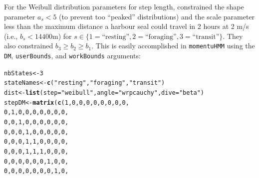 \documentclass[12pt]{article}\usepackage[]{graphicx}\usepackage[]{xcolor}
\makeatletter
\newcommand{\hlnum}[1]{\textcolor[rgb]{0.686,0.059,0.569}{#1}}%
\newcommand{\hlsng}[1]{\textcolor[rgb]{0.192,0.494,0.8}{#1}}%
\newcommand{\hldef}[1]{\textcolor[rgb]{0.345,0.345,0.345}{#1}}%
\newcommand{\hlkwb}[1]{\textcolor[rgb]{0.69,0.353,0.396}{#1}}%
\newcommand{\hlkwc}[1]{\textcolor[rgb]{0.333,0.667,0.333}{#1}}%
\newcommand{\hlkwd}[1]{\textcolor[rgb]{0.737,0.353,0.396}{\textbf{#1}}}%
\newenvironment{kframe}{%
 \def\at@end@of@kframe{}%
 \ifinner\ifhmode%
  \def\at@end@of@kframe{\end{minipage}}%
  \begin{minipage}{\columnwidth}%
 \fi\fi%
 \def\FrameCommand##1{\hskip\@totalleftmargin \hskip-\fboxsep
 \colorbox{shadecolor}{##1}\hskip-\fboxsep
     \hskip-\linewidth \hskip-\@totalleftmargin \hskip\columnwidth}%
 \MakeFramed {\advance\hsize-\width
   \@totalleftmargin\z@ \linewidth\hsize
   \@setminipage}}%
 {\par\unskip\endMakeFramed%
 \at@end@of@kframe}
\newenvironment{knitrout}{}{} %
\makeatother
\begin{document}
For the Weibull distribution parameters for step length, \cite{McClintockEtAl2013c} constrained the shape parameter $a_s<5$ (to prevent too ``peaked'' distributions) and the scale parameter less than the maximum distance a harbour seal could travel in 2 hours at 2 m/s (i.e., $b_s<14400$m) for $s \in \{1=\text{``resting''},2=\text{``foraging''},3=\text{``transit''} \}$. They also constrained $b_3\ge b_2 \ge b_1$.  This is easily accomplished in \verb|momentuHMM| using the \verb|DM|, \verb|userBounds|, and \verb|workBounds| arguments:
\begin{knitrout}
\color{fgcolor}\begin{kframe}
\begin{alltt}
\hldef{nbStates} \hlkwb{<-} \hlnum{3}
\hldef{stateNames} \hlkwb{<-} \hlkwd{c}\hldef{(}\hlsng{"resting"}\hldef{,} \hlsng{"foraging"}\hldef{,} \hlsng{"transit"}\hldef{)}
\hldef{dist} \hlkwb{<-} \hlkwd{list}\hldef{(}\hlkwc{step} \hldef{=} \hlsng{"weibull"}\hldef{,} \hlkwc{angle} \hldef{=} \hlsng{"wrpcauchy"}\hldef{,} \hlkwc{dive} \hldef{=} \hlsng{"beta"}\hldef{)}
\hldef{stepDM}\hlkwb{<-}\hlkwd{matrix}\hldef{(}\hlkwd{c}\hldef{(}\hlnum{1}\hldef{,}\hlnum{0}\hldef{,}\hlnum{0}\hldef{,}\hlnum{0}\hldef{,}\hlnum{0}\hldef{,}\hlnum{0}\hldef{,}\hlnum{0}\hldef{,}\hlnum{0}\hldef{,}\hlnum{0}\hldef{,}
                 \hlnum{0}\hldef{,}\hlnum{1}\hldef{,}\hlnum{0}\hldef{,}\hlnum{0}\hldef{,}\hlnum{0}\hldef{,}\hlnum{0}\hldef{,}\hlnum{0}\hldef{,}\hlnum{0}\hldef{,}\hlnum{0}\hldef{,}
                 \hlnum{0}\hldef{,}\hlnum{0}\hldef{,}\hlnum{1}\hldef{,}\hlnum{0}\hldef{,}\hlnum{0}\hldef{,}\hlnum{0}\hldef{,}\hlnum{0}\hldef{,}\hlnum{0}\hldef{,}\hlnum{0}\hldef{,}
                 \hlnum{0}\hldef{,}\hlnum{0}\hldef{,}\hlnum{0}\hldef{,}\hlnum{1}\hldef{,}\hlnum{0}\hldef{,}\hlnum{0}\hldef{,}\hlnum{0}\hldef{,}\hlnum{0}\hldef{,}\hlnum{0}\hldef{,}
                 \hlnum{0}\hldef{,}\hlnum{0}\hldef{,}\hlnum{0}\hldef{,}\hlnum{1}\hldef{,}\hlnum{1}\hldef{,}\hlnum{0}\hldef{,}\hlnum{0}\hldef{,}\hlnum{0}\hldef{,}\hlnum{0}\hldef{,}
                 \hlnum{0}\hldef{,}\hlnum{0}\hldef{,}\hlnum{0}\hldef{,}\hlnum{1}\hldef{,}\hlnum{1}\hldef{,}\hlnum{1}\hldef{,}\hlnum{0}\hldef{,}\hlnum{0}\hldef{,}\hlnum{0}\hldef{,}
                 \hlnum{0}\hldef{,}\hlnum{0}\hldef{,}\hlnum{0}\hldef{,}\hlnum{0}\hldef{,}\hlnum{0}\hldef{,}\hlnum{0}\hldef{,}\hlnum{1}\hldef{,}\hlnum{0}\hldef{,}\hlnum{0}\hldef{,}
                 \hlnum{0}\hldef{,}\hlnum{0}\hldef{,}\hlnum{0}\hldef{,}\hlnum{0}\hldef{,}\hlnum{0}\hldef{,}\hlnum{0}\hldef{,}\hlnum{0}\hldef{,}\hlnum{1}\hldef{,}\hlnum{0}\hldef{,}

\end{alltt}
\end{kframe}
\end{knitrout}
\end{document}
